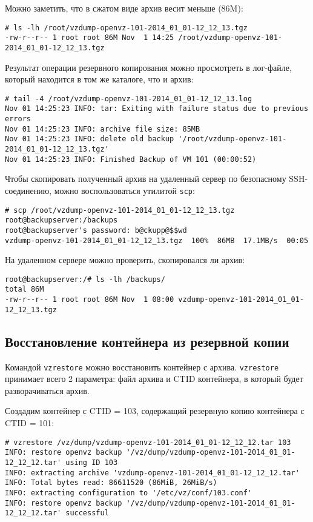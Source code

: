 Можно заметить, что в сжатом виде архив весит меньше (86M):
\begin{lstlisting}
# ls -lh /root/vzdump-openvz-101-2014_01_01-12_12_13.tgz
-rw-r--r-- 1 root root 86M Nov  1 14:25 /root/vzdump-openvz-101-2014_01_01-12_12_13.tgz
\end{lstlisting}

Результат операции резервного копирования можно просмотреть в лог-файле, который находится в том же каталоге, что и архив:
\begin{lstlisting}
# tail -4 /root/vzdump-openvz-101-2014_01_01-12_12_13.log
Nov 01 14:25:23 INFO: tar: Exiting with failure status due to previous errors
Nov 01 14:25:23 INFO: archive file size: 85MB
Nov 01 14:25:23 INFO: delete old backup '/root/vzdump-openvz-101-2014_01_01-12_12_13.tgz'
Nov 01 14:25:23 INFO: Finished Backup of VM 101 (00:00:52)
\end{lstlisting}

Чтобы скопировать полученный архив на удаленный сервер по безопасному SSH-соединению, можно воспользоваться утилитой \texttt{scp}:
\begin{lstlisting}
# scp /root/vzdump-openvz-101-2014_01_01-12_12_13.tgz root@backupserver:/backups
root@backupserver's password: b@ckupp@$$wd
vzdump-openvz-101-2014_01_01-12_12_13.tgz  100%  86MB  17.1MB/s  00:05 
\end{lstlisting}

На удаленном сервере можно проверить, скопировался ли архив:
\begin{lstlisting}
root@backupserver:/# ls -lh /backups/
total 86M
-rw-r--r-- 1 root root 86M Nov  1 08:00 vzdump-openvz-101-2014_01_01-12_12_13.tgz
\end{lstlisting}

\subsection{Восстановление контейнера из резервной копии}
Командой \texttt{vzrestore} можно восстановить контейнер с архива. 
\texttt{vzrestore} принимает всего 2 параметра: файл архива и CTID контейнера, в который будет разворачиваться архив.

Создадим контейнер с CTID = 103, содержащий резервную копию контейнера с CTID = 101:
\begin{lstlisting}
# vzrestore /vz/dump/vzdump-openvz-101-2014_01_01-12_12_12.tar 103
INFO: restore openvz backup '/vz/dump/vzdump-openvz-101-2014_01_01-12_12_12.tar' using ID 103
INFO: extracting archive 'vzdump-openvz-101-2014_01_01-12_12_12.tar'
INFO: Total bytes read: 86611520 (86MiB, 26MiB/s)
INFO: extracting configuration to '/etc/vz/conf/103.conf'
INFO: restore openvz backup '/vz/dump/vzdump-openvz-101-2014_01_01-12_12_12.tar' successful
\end{lstlisting}


